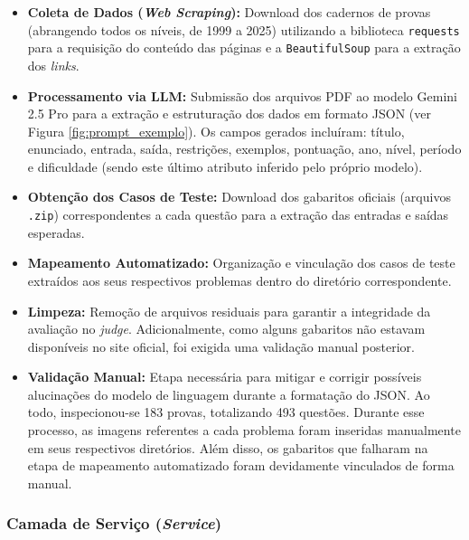 \documentclass[sigconf,anonymous]{acmart} %
\begin{document}
\begin{itemize}
    \item \textbf{Coleta de Dados (\textit{Web Scraping}):} Download dos cadernos de provas (abrangendo todos os níveis, de 1999 a 2025) utilizando a biblioteca \texttt{requests} para a requisição do conteúdo das páginas e a \texttt{BeautifulSoup} para a extração dos \textit{links}.
    
    \item \textbf{Processamento via LLM:} Submissão dos arquivos PDF ao modelo Gemini 2.5 Pro para a extração e estruturação dos dados em formato JSON (ver Figura \ref{fig:prompt_exemplo}). Os campos gerados incluíram: título, enunciado, entrada, saída, restrições, exemplos, pontuação, ano, nível, período e dificuldade (sendo este último atributo inferido pelo próprio modelo).
    
    \item \textbf{Obtenção dos Casos de Teste:} Download dos gabaritos oficiais (arquivos \texttt{.zip}) correspondentes a cada questão para a extração das entradas e saídas esperadas.
    
    \item \textbf{Mapeamento Automatizado:} Organização e vinculação dos casos de teste extraídos aos seus respectivos problemas dentro do diretório correspondente.
    
    \item \textbf{Limpeza:} Remoção de arquivos residuais para garantir a integridade da avaliação no \textit{judge}. Adicionalmente, como alguns gabaritos não estavam disponíveis no site oficial, foi exigida uma validação manual posterior.
    
    \item \textbf{Validação Manual:} Etapa necessária para mitigar e corrigir possíveis alucinações do modelo de linguagem durante a formatação do JSON. Ao todo, inspecionou-se 183 provas, totalizando 493 questões. Durante esse processo, as imagens referentes a cada problema foram inseridas manualmente em seus respectivos diretórios. Além disso, os gabaritos que falharam na etapa de mapeamento automatizado foram devidamente vinculados de forma manual.
\end{itemize}

\subsubsection{Camada de Serviço (\textit{Service})}
\label{sec:Camada de Service}
\end{document}
